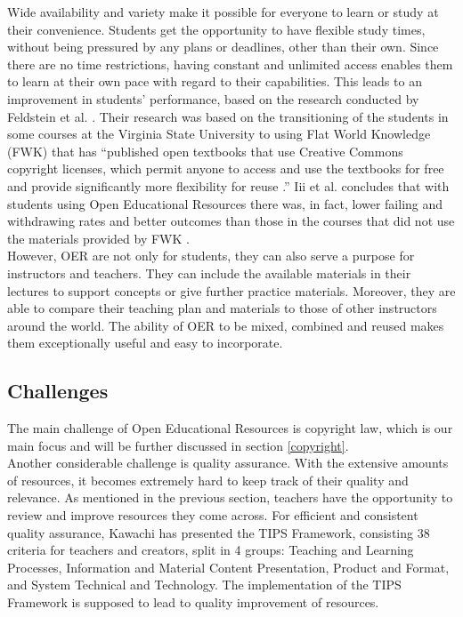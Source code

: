 \documentclass[a4paper]{article}
\begin{document}
\noindent
Wide availability and variety make it possible for everyone to learn or study at their convenience. Students get the opportunity to have flexible study times, without being pressured by any plans or deadlines, other than their own. Since there are no time restrictions, having constant and unlimited access enables them to learn at their own pace with regard to their capabilities. This leads to an improvement in students' performance, based on the research conducted by Feldstein et al. \cite{outcomes}. Their research was based on the transitioning of the students in some courses at the Virginia State University to using Flat World Knowledge (FWK) that has ``published open textbooks that use Creative Commons copyright licenses, which permit anyone to access and use the textbooks for free and provide significantly more flexibility for reuse \cite{fwk}.'' Iii et al. concludes that with students using Open Educational Resources there was, in fact, lower failing and withdrawing rates and better outcomes than those in the courses that did not use the materials provided by FWK \cite{fwk}. \\

\noindent
However, OER are not only for students, they can also serve a purpose for instructors and teachers. They can include the available materials in their lectures to support concepts or give further practice materials. Moreover, they are able to compare their teaching plan and materials to those of other instructors around the world. The ability of OER to be mixed, combined and reused makes them exceptionally useful and easy to incorporate. 

\subsection{Challenges} 
The main challenge of Open Educational Resources is copyright law, which is our main focus and will be further discussed in section \ref{copyright}. \\

\noindent
Another considerable challenge is quality assurance. With the extensive amounts of resources, it becomes extremely hard to keep track of their quality and relevance. As mentioned in the previous section, teachers have the opportunity to review and improve resources they come across. For efficient and consistent quality assurance, Kawachi \cite{kawachi} has presented the TIPS Framework, consisting 38 criteria for teachers and creators, split in 4 groups: Teaching and Learning Processes, Information and Material Content Presentation, Product and Format, and System Technical and Technology. The implementation of the TIPS Framework is supposed to lead to quality improvement of resources.\\ 
\end{document}
